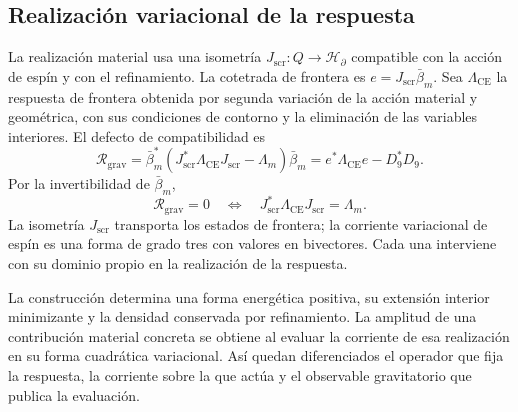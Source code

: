 \subsection{Realización variacional de la respuesta}
\label{vii:vii:sec:realizacion-respuesta}

La realización material usa una isometría
\(J_{\mathrm{scr}}:Q\longrightarrow\mathcal H_\partial\)
compatible con la acción de espín y con el refinamiento.
La cotetrada de frontera es \(e=J_{\mathrm{scr}}\bar\beta_m\).
Sea \(\Lambda_{\mathrm{CE}}\) la respuesta de frontera obtenida
por segunda variación de la acción material y geométrica, con sus
condiciones de contorno y la eliminación de las variables interiores.
El defecto de compatibilidad es
\begin{equation}
 \mathcal R_{\mathrm{grav}}
 =\bar\beta_m^*
   (J_{\mathrm{scr}}^*\Lambda_{\mathrm{CE}}J_{\mathrm{scr}}-\Lambda_m)
   \bar\beta_m
 =e^*\Lambda_{\mathrm{CE}}e-D_9^*D_9.
 \label{vii:vii:eq:defecto-respuesta}
\end{equation}
Por la invertibilidad de \(\bar\beta_m\),
\[
 \mathcal R_{\mathrm{grav}}=0
 \quad\Longleftrightarrow\quad
 J_{\mathrm{scr}}^*\Lambda_{\mathrm{CE}}J_{\mathrm{scr}}=\Lambda_m.
\]
La isometría \(J_{\mathrm{scr}}\) transporta los estados de frontera;
la corriente variacional de espín es una forma de grado tres con valores
en bivectores. Cada una interviene con su dominio propio en la
realización de la respuesta.

La construcción determina una forma energética positiva, su extensión
interior minimizante y la densidad conservada por refinamiento.
La amplitud de una contribución material concreta se obtiene al evaluar
la corriente de esa realización en su forma cuadrática variacional.
Así quedan diferenciados el operador que fija la respuesta, la corriente
sobre la que actúa y el observable gravitatorio que publica la evaluación.
